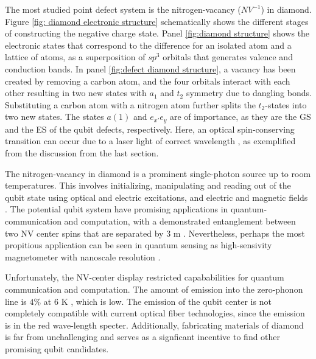 The most studied point defect system is the nitrogen-vacancy ($NV^{-1}$) in diamond. Figure \ref{fig: diamond electronic structure} schematically shows the different stages of constructing the negative charge state. Panel \ref{fig:diamond structure} shows the electronic states that correspond to the difference for an isolated atom and a lattice of atoms, as a superposition of $sp^3$ orbitals that generates valence and conduction bands. In panel \ref{fig:defect diamond structure}, a vacancy has been created by removing a carbon atom, and the four orbitals interact with each other resulting in two new states with $a_1$ and $t_2$ symmetry due to dangling bonds. Substituting a carbon atom with a nitrogen atom further splits the $t_2$-states into two new states. The states $a(1)$ and $e_{x'}e_y$ are of importance, as they are the GS and the ES of the qubit defects, respectively. Here, an optical spin-conserving transition can occur due to a laser light of correct wavelength \cite{Gordon2013}, as exemplified from the discussion from the last section.

\clearpage

\clearpage

\noindent The nitrogen-vacancy in diamond is a prominent single-photon source up to room temperatures. This involves initializing, manipulating and reading out of the qubit state using optical and electric excitations, and electric and magnetic fields \cite{Gordon2013}. The potential qubit system have promising applications in quantum- communication and computation, with a demonstrated entanglement between two NV center spins that are separated by $3$ m \cite{Bernien2013}. Nevertheless, perhaps the most propitious application can be seen in quantum sensing as high-sensivity magnetometer with nanoscale resolution \cite{Taylor2008}.

Unfortunately, the NV-center display restricted capababilities for quantum communication and computation. The amount of emission into the zero-phonon line is $4 \%$ at $6$ K \cite{Barclay2011}, which is low. The emission of the qubit center is not completely compatible with current optical fiber technologies, since the emission is in the red wave-length specter. Additionally, fabricating materials of diamond is far from unchallenging and serves as a signficant incentive to find other promising qubit candidates.

